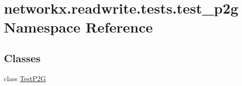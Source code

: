 \hypertarget{namespacenetworkx_1_1readwrite_1_1tests_1_1test__p2g}{}\section{networkx.\+readwrite.\+tests.\+test\+\_\+p2g Namespace Reference}
\label{namespacenetworkx_1_1readwrite_1_1tests_1_1test__p2g}
\subsection*{Classes}
\begin{DoxyCompactItemize}
\item 
class \hyperlink{classnetworkx_1_1readwrite_1_1tests_1_1test__p2g_1_1TestP2G}{Test\+P2G}
\end{DoxyCompactItemize}
